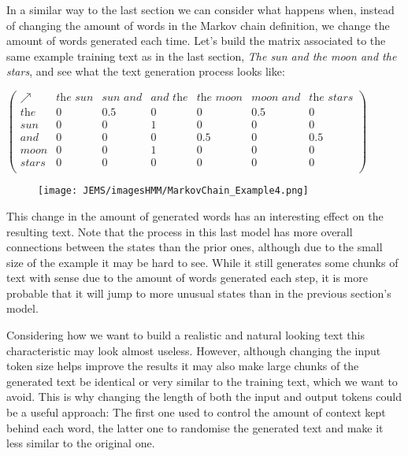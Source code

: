 \documentclass[12pt]{article}
\numberwithin{equation}{section}
\begin{document}
In a similar way to the last section we can consider what happens when, instead of changing the amount of words in the Markov chain definition, we change the amount of words generated each time. Let's build the matrix associated to the same example training text as in the last section, \textit{The sun and the moon and the stars}, and see what the text generation process looks like:

\begin{center}
$\begin{pmatrix}
\nearrow & \textit{the sun} & \textit{sun and} & \textit{and the} & \textit{the moon} & \textit{moon and} & \textit{the stars} \\
\textit{the} & 0 & 0.5 & 0 & 0 & 0.5 & 0 \\
\textit{sun} & 0 & 0 & 1 & 0 & 0 & 0 \\
\textit{and} & 0 & 0 & 0 & 0.5 & 0 & 0.5 \\
\textit{moon} & 0 & 0 & 1 & 0 & 0 & 0 \\
\textit{stars} & 0 & 0 & 0 & 0 & 0 & 0 \\
\end{pmatrix}$
\end{center}

\begin{figure}[H]
\begin{center}
    \texttt{[image: JEMS/imagesHMM/MarkovChain\_Example4.png]}
\end{center}
\end{figure}

This change in the amount of generated words has an interesting effect on the resulting text. Note that the process in this last model has more overall connections between the states than the prior ones, although due to the small size of the example it may be hard to see. While it still generates some chunks of text with sense due to the amount of words generated each step, it is more probable that it will jump to more unusual states than in the previous section's model.

Considering how we want to build a realistic and natural looking text this characteristic may look almost useless. However, although changing the input token size helps improve the results it may also make large chunks of the generated text be identical or very similar to the training text, which we want to avoid. This is why changing the length of both the input and output tokens could be a useful approach: The first one used to control the amount of context kept behind each word, the latter one to randomise the generated text and make it less similar to the original one.
\end{document}
